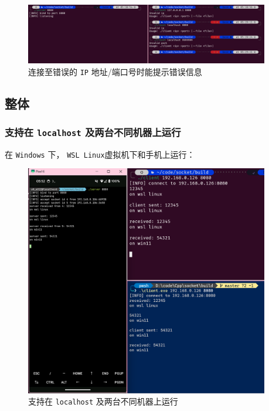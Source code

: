 \documentclass{article}
\begin{document}
\begin{figure}[H]
    \centering
    \includegraphics[width=0.95\textwidth]{img/6.png}
    \caption{连接至错误的 \texttt{IP} 地址/端口号时能提示错误信息}
\end{figure}

\subsection{整体}

\subsubsection{支持在 \texttt{localhost} 及两台不同机器上运行}

在 \texttt{Windows} 下， \texttt{WSL Linux}虚拟机下和手机上运行：

\begin{figure}[H]
    \centering
    \includegraphics[width=0.95\textwidth]{img/7.png}
    \caption{支持在 \texttt{localhost} 及两台不同机器上运行}
\end{figure}
\end{document}
